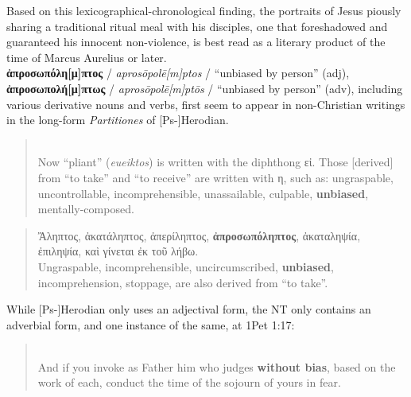 Based on this lexicographical-chronological finding, %
the portraits of Jesus piously sharing a traditional ritual meal with his disciples, %
one that foreshadowed and guaranteed his innocent non-violence, %
is best read as a literary product of the time of Marcus Aurelius or later. \\[1mm] %

\noindent{}\textbf{ἀπροσωπόλη[μ]πτος} / \textit{aprosōpolē[m]ptos} / “unbiased by person” (adj), \\
\noindent{}\textbf{ἀπροσωπολή[μ]πτως} / \textit{aprosōpolē[m]ptōs} / “unbiased by person” (adv), %
including various derivative nouns and verbs, %
first seem to appear in non-Christian writings in the long-form \textit{Partitiones} of [Ps-]Herodian. %

\vspace*{2mm}
\begin{quote} \\[1mm] %
Now “pliant” (\textit{eueiktos}) is written with the diphthong εἰ. %
Those [derived] from “to take” and “to receive” are written with η, %
such as: ungraspable, uncontrollable, incomprehensible, unassailable, %
culpable, \textbf{unbiased}, mentally-composed.
\end{quote}
\clearpage

\begin{quote}
Ἄληπτος, ἀκατάληπτος, ἀπερίληπτος, \textbf{ἀπροσωπόληπτος}, %
ἀκατα\-ληψία, ἐπιληψία, καὶ γίνεται ἐκ τοῦ λήβω. \\[1mm] %
Ungraspable, incomprehensible, uncircumscribed, \textbf{unbiased}, %
incom\-prehension, stoppage, are also derived from “to take”. %
\end{quote}
\vspace*{2mm}

\noindent{}While [Ps-]Herodian only uses an adjectival form, %
the NT only contains an adverbial form, and one instance of the same, %
at 1Pet 1:17: %

\vspace*{3mm} 
 \begin{quote} \\[1mm] %
 And if you invoke as Father him who judges \textbf{without bias}, based on the work of each, %
 conduct the time of the sojourn of yours in fear. \end{quote} %
 \vspace*{3mm}

